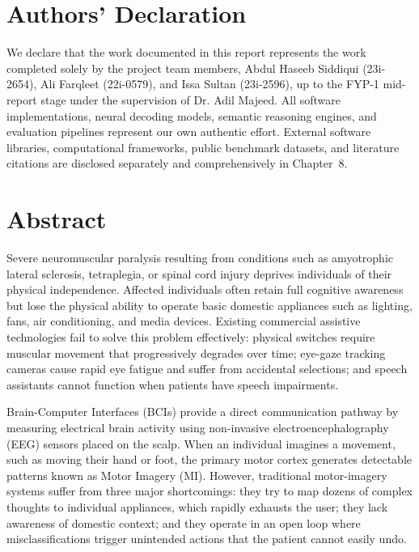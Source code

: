 \documentclass[12pt,a4paper]{report}
\begin{document}
\newpage
\chapter*{Authors' Declaration}

We declare that the work documented in this report represents the work completed solely by the project team members, Abdul Haseeb Siddiqui (23i-2654), Ali Farqleet (22i-0579), and Issa Sultan (23i-2596), up to the FYP-1 mid-report stage under the supervision of Dr. Adil Majeed. All software implementations, neural decoding models, semantic reasoning engines, and evaluation pipelines represent our own authentic effort. External software libraries, computational frameworks, public benchmark datasets, and literature citations are disclosed separately and comprehensively in Chapter~8.

\newpage
\chapter*{Abstract}

Severe neuromuscular paralysis resulting from conditions such as amyotrophic lateral sclerosis, tetraplegia, or spinal cord injury deprives individuals of their physical independence. Affected individuals often retain full cognitive awareness but lose the physical ability to operate basic domestic appliances such as lighting, fans, air conditioning, and media devices. Existing commercial assistive technologies fail to solve this problem effectively: physical switches require muscular movement that progressively degrades over time; eye-gaze tracking cameras cause rapid eye fatigue and suffer from accidental selections; and speech assistants cannot function when patients have speech impairments.

Brain-Computer Interfaces (BCIs) provide a direct communication pathway by measuring electrical brain activity using non-invasive electroencephalography (EEG) sensors placed on the scalp. When an individual imagines a movement, such as moving their hand or foot, the primary motor cortex generates detectable patterns known as Motor Imagery (MI). However, traditional motor-imagery systems suffer from three major shortcomings: they try to map dozens of complex thoughts to individual appliances, which rapidly exhausts the user; they lack awareness of domestic context; and they operate in an open loop where misclassifications trigger unintended actions that the patient cannot easily undo.
\end{document}
